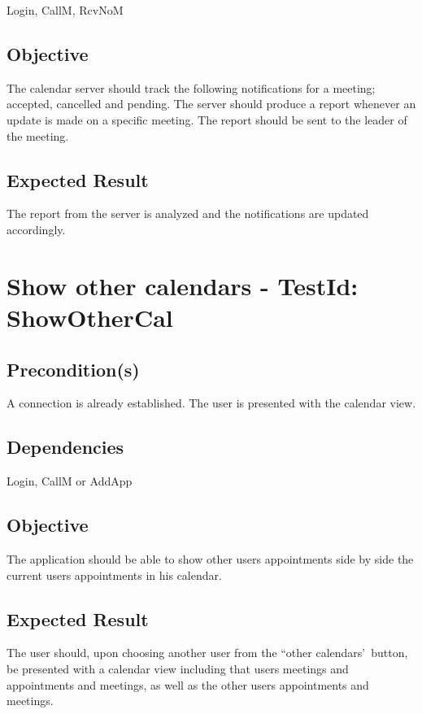 \documentclass{article}
\begin{document}
Login, CallM, RcvNoM

\subsection{Objective}

The calendar server should track the following notifications for a meeting;
accepted, cancelled and pending. The server should produce a report whenever
an update is made on a specific meeting. The report should be sent to the
leader of the meeting.

\subsection{Expected Result}

The report from the server is analyzed and the notifications are updated
accordingly. \newpage

\section{Show other calendars - TestId: ShowOtherCal}

\subsection{Precondition(s)}

A connection is already established. The user is presented with the calendar
view.

\subsection{Dependencies}

Login, CallM or AddApp

\subsection{Objective}

The application should be able to show other users appointments side by side
the current users appointments in his calendar.

\subsection{Expected Result}

The user should, upon choosing another user from the ``other calendars'\
button, be presented with a calendar view including that users meetings and
appointments and meetings, as well as the other users appointments and
meetings.
\end{document}
